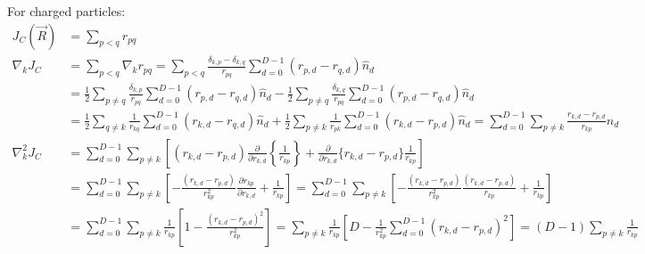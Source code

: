 \documentclass[12pt]{article}
\begin{document}
\noindent For charged particles:
\begin{align*}
J_C (\vec{R}) &= \sum_{p<q} r_{pq} \\
\nabla_k J_C &= \sum_{p<q} \nabla_k r_{pq} = \sum_{p<q} \frac{\delta_{k,p}-\delta_{k,q}}{r_{pq}} \sum_{d=0}^{D-1} (r_{p,d}-r_{q,d}) \hat{n}_{d}\\
&= \frac{1}{2} \sum_{p\neq q} \frac{\delta_{k,p}}{r_{pq}} \sum_{d=0}^{D-1} (r_{p,d}-r_{q,d}) \hat{n}_{d} - \frac{1}{2} \sum_{p\neq q} \frac{\delta_{k,q}}{r_{pq}} \sum_{d=0}^{D-1} (r_{p,d}-r_{q,d}) \hat{n}_{d}\\
&= \frac{1}{2} \sum_{q\neq k} \frac{1}{r_{kq}} \sum_{d=0}^{D-1} (r_{k,d}-r_{q,d}) \hat{n}_{d} + \frac{1}{2} \sum_{p\neq k} \frac{1}{r_{pk}} \sum_{d=0}^{D-1} (r_{k,d}-r_{p,d}) \hat{n}_{d}= \sum_{d=0}^{D-1} \sum_{p\neq k} \frac{r_{k,d}-r_{p,d}}{r_{kp}} \hat{n}_{d}\\
\nabla_k^2 J_C 
&= \sum_{d=0}^{D-1} \sum_{p\neq k} \left[
(r_{k,d}-r_{p,d}) \frac{\partial}{\partial r_{k,d}} \left\{ \frac{1}{r_{kp}} \right\} + \frac{\partial}{\partial r_{k,d}} \Big\{ r_{k,d}-r_{p,d} \Big\} \frac{1}{r_{kp}} 
 \right]\\
 &= \sum_{d=0}^{D-1} \sum_{p\neq k} \left[
-\frac{(r_{k,d}-r_{p,d})}{r_{kp}^2} \frac{\partial r_{kp}}{\partial r_{k,d}}  + \frac{1}{r_{kp}} 
 \right]
 = \sum_{d=0}^{D-1} \sum_{p\neq k} \left[
-\frac{(r_{k,d}-r_{p,d})}{r_{kp}^2} \frac{(r_{k,d}-r_{p,d})}{r_{kp}}  + \frac{1}{r_{kp}} 
 \right]\\
 &= \sum_{d=0}^{D-1} \sum_{p\neq k} \frac{1}{r_{kp}}
  \left[ 1
-\frac{(r_{k,d}-r_{p,d})^2}{r_{kp}^2}  
 \right] = \sum_{p \neq k} \frac{1}{r_{kp}} 
 \left[  D - \frac{1}{r_{kp}^2} \sum_{d=0}^{D-1} (r_{k,d}-r_{p,d})^2
 \right] = (D-1) \sum_{p\neq k} \frac{1}{r_{kp}} \\
\end{align*}
\end{document}
